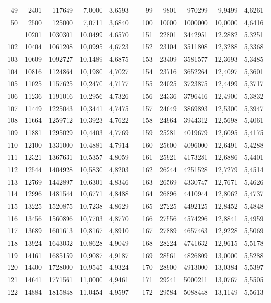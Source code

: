 \begin{longtable}{rrrrrrrrrrr}
49&2401&117649&7,0000&3,6593&&99&9801&970299&9,9499&4,6261\\
50&2500&125000&7,0711&3,6840&&100&10000&1000000&10,0000&4,6416\\
\newpage
101&10201&1030301&10,0499&4,6570&&151&22801&3442951&12,2882&5,3251\\
102&10404&1061208&10,0995&4,6723&&152&23104&3511808&12,3288&5,3368\\
103&10609&1092727&10,1489&4,6875&&153&23409&3581577&12,3693&5,3485\\
104&10816&1124864&10,1980&4,7027&&154&23716&3652264&12,4097&5,3601\\
105&11025&1157625&10,2470&4,7177&&155&24025&3723875&12,4499&5,3717\\
106&11236&1191016&10,2956&4,7326&&156&24336&3796416&12,4900&5,3832\\
107&11449&1225043&10,3441&4,7475&&157&24649&3869893&12,5300&5,3947\\
108&11664&1259712&10,3923&4,7622&&158&24964&3944312&12,5698&5,4061\\
109&11881&1295029&10,4403&4,7769&&159&25281&4019679&12,6095&5,4175\\
110&12100&1331000&10,4881&4,7914&&160&25600&4096000&12,6491&5,4288\\
111&12321&1367631&10,5357&4,8059&&161&25921&4173281&12,6886&5,4401\\
112&12544&1404928&10,5830&4,8203&&162&26244&4251528&12,7279&5,4514\\
113&12769&1442897&10,6301&4,8346&&163&26569&4330747&12,7671&5,4626\\
114&12996&1481544&10,6771&4,8488&&164&26896&4410944&12,8062&5,4737\\
115&13225&1520875&10,7238&4,8629&&165&27225&4492125&12,8452&5,4848\\
116&13456&1560896&10,7703&4,8770&&166&27556&4574296&12,8841&5,4959\\
117&13689&1601613&10,8167&4,8910&&167&27889&4657463&12,9228&5,5069\\
118&13924&1643032&10,8628&4,9049&&168&28224&4741632&12,9615&5,5178\\
119&14161&1685159&10,9087&4,9187&&169&28561&4826809&13,0000&5,5288\\
120&14400&1728000&10,9545&4,9324&&170&28900&4913000&13,0384&5,5397\\
121&14641&1771561&11,0000&4,9461&&171&29241&5000211&13,0767&5,5505\\
122&14884&1815848&11,0454&4,9597&&172&29584&5088448&13,1149&5,5613\\

\end{longtable}
